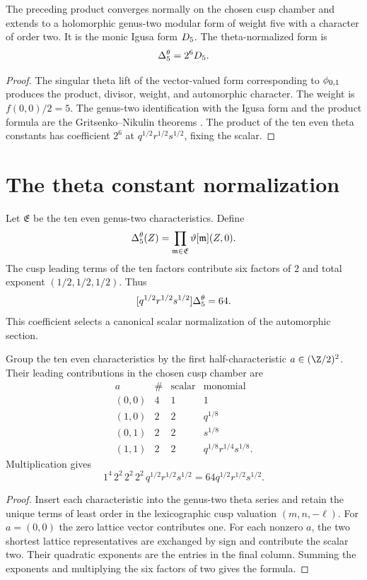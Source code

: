 \begin{theorem}
The preceding product converges normally on the chosen cusp chamber and extends to a holomorphic genus-two modular form of weight five with a character of order two. It is the monic Igusa form ${D_5}$. The theta-normalized form is
\[
 {\Delta^{\theta}_5}=2^6{D_5}.
\]
\end{theorem}
\begin{proof}
The singular theta lift of the vector-valued form corresponding to ${\phi_{0,1}}$ produces the product, divisor, weight, and automorphic character. The weight is $f(0,0)/2=5$. The genus-two identification with the Igusa form and the product formula are the Gritsenko--Nikulin theorems \cite{Borcherds95,Borcherds98,GN97,GN98b}. The product of the ten even theta constants has coefficient $2^6$ at $q^{1/2}r^{1/2}s^{1/2}$, fixing the scalar.
\end{proof}

\section{The theta constant normalization}
Let $\mathfrak E$ be the ten even genus-two characteristics. Define
\[
 {\Delta^{\theta}_5}(Z)=\prod_{\mathfrak m\in\mathfrak E}\vartheta[\mathfrak m](Z,0).
\]
The cusp leading terms of the ten factors contribute six factors of $2$ and total exponent $(1/2,1/2,1/2)$. Thus
\[
 [q^{1/2}r^{1/2}s^{1/2}]{\Delta^{\theta}_5}=64.
\]
This coefficient selects a canonical scalar normalization of the automorphic section.

\begin{proposition}
Group the ten even characteristics by the first half-characteristic $a\in(\Z/2)^2$. Their leading contributions in the chosen cusp chamber are
\[
\begin{array}{c|c|c|c}
a&\#&\text{scalar}&\text{monomial}\\ \hline
(0,0)&4&1&1\\
(1,0)&2&2&q^{1/8}\\
(0,1)&2&2&s^{1/8}\\
(1,1)&2&2&q^{1/8}r^{1/4}s^{1/8}.
\end{array}
\]
Multiplication gives
\[
 1^4\,2^2\,2^2\,2^2\,
 q^{1/2}r^{1/2}s^{1/2}
 =64q^{1/2}r^{1/2}s^{1/2}.
\]
\end{proposition}
\begin{proof}
Insert each characteristic into the genus-two theta series and retain the unique terms of least order in the lexicographic cusp valuation $(m,n,-\ell)$. For $a=(0,0)$ the zero lattice vector contributes one. For each nonzero $a$, the two shortest lattice representatives are exchanged by sign and contribute the scalar two. Their quadratic exponents are the entries in the final column. Summing the exponents and multiplying the six factors of two gives the formula.
\end{proof}

